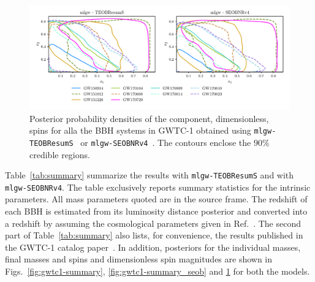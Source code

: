 \begin{figure}[t]
	\centering
    \includegraphics[width=\textwidth]{img/spins_TEOB_SEOB.pdf}
	\caption{Posterior probability densities of the component, dimensionless, spins for alla the BBH systems in GWTC-1 
	obtained using {\tt mlgw-TEOBResumS}~\cite{Nagar:2020pcj} or {\tt mlgw-SEOBNRv4}~\cite{Bohe:2016gbl}. 
	The contours enclose the $90\%$ credible regions.}
	\label{fig:gwtc1_eob_spins}
\end{figure}
Table~\ref{tab:summary} summarize the results with {\tt mlgw-TEOBResumS} 
and with {\tt mlgw-SEOBNRv4}. The table exclusively reports summary statistics 
for the intrinsic parameters. All mass parameters quoted are in the source frame. 
The redshift of each BBH is estimated from its luminosity distance posterior and 
converted into a redshift by assuming the cosmological parameters given in Ref.~\cite{Aghanim:2018eyx}.
The second part of Table~\ref{tab:summary} also lists, for convenience, the results
published in the GWTC-1 catalog paper~\cite{LIGOScientific:2018mvr}.
In addition, posteriors for the individual masses, final masses and spins and dimensionless
spin magnitudes are shown in Figs.~\ref{fig:gwtc1-summary}, \ref{fig:gwtc1-summary_seob} and \ref{fig:gwtc1_eob_spins}
for both the models.

